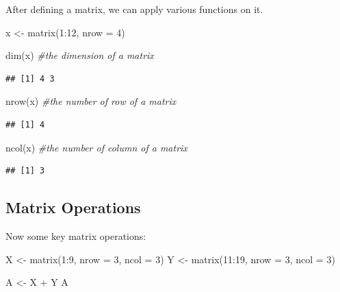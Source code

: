 \documentclass[
]{book}
\newenvironment{Shaded}{\begin{snugshade}}{\end{snugshade}}
\newcommand{\AttributeTok}[1]{\textcolor[rgb]{0.77,0.63,0.00}{#1}}
\newcommand{\CommentTok}[1]{\textcolor[rgb]{0.56,0.35,0.01}{\textit{#1}}}
\newcommand{\DecValTok}[1]{\textcolor[rgb]{0.00,0.00,0.81}{#1}}
\newcommand{\FunctionTok}[1]{\textcolor[rgb]{0.00,0.00,0.00}{#1}}
\newcommand{\NormalTok}[1]{#1}
\newcommand{\OtherTok}[1]{\textcolor[rgb]{0.56,0.35,0.01}{#1}}
\newcommand{\SpecialCharTok}[1]{\textcolor[rgb]{0.00,0.00,0.00}{#1}}
\theoremstyle{definition}
\theoremstyle{definition}
\theoremstyle{definition}
\theoremstyle{definition}
\theoremstyle{remark}
\begin{document}
After defining a matrix, we can apply various functions on it.

\begin{Shaded}
\begin{Highlighting}[]
\NormalTok{x }\OtherTok{\textless{}{-}} \FunctionTok{matrix}\NormalTok{(}\DecValTok{1}\SpecialCharTok{:}\DecValTok{12}\NormalTok{, }\AttributeTok{nrow =} \DecValTok{4}\NormalTok{)}

\FunctionTok{dim}\NormalTok{(x)            }\CommentTok{\#the dimension of a matrix         }
\end{Highlighting}
\end{Shaded}

\begin{verbatim}
## [1] 4 3
\end{verbatim}

\begin{Shaded}
\begin{Highlighting}[]
\FunctionTok{nrow}\NormalTok{(x)           }\CommentTok{\#the number of row of a matrix }
\end{Highlighting}
\end{Shaded}

\begin{verbatim}
## [1] 4
\end{verbatim}

\begin{Shaded}
\begin{Highlighting}[]
\FunctionTok{ncol}\NormalTok{(x)           }\CommentTok{\#the number of column of a matrix }
\end{Highlighting}
\end{Shaded}

\begin{verbatim}
## [1] 3
\end{verbatim}

\hypertarget{matrix-operations}{%
\subsection{Matrix Operations}\label{matrix-operations}}

Now some key matrix operations:

\begin{Shaded}
\begin{Highlighting}[]
\NormalTok{X }\OtherTok{\textless{}{-}} \FunctionTok{matrix}\NormalTok{(}\DecValTok{1}\SpecialCharTok{:}\DecValTok{9}\NormalTok{, }\AttributeTok{nrow =} \DecValTok{3}\NormalTok{, }\AttributeTok{ncol =} \DecValTok{3}\NormalTok{)}
\NormalTok{Y }\OtherTok{\textless{}{-}} \FunctionTok{matrix}\NormalTok{(}\DecValTok{11}\SpecialCharTok{:}\DecValTok{19}\NormalTok{, }\AttributeTok{nrow =} \DecValTok{3}\NormalTok{, }\AttributeTok{ncol =} \DecValTok{3}\NormalTok{)}

\NormalTok{A }\OtherTok{\textless{}{-}}\NormalTok{ X }\SpecialCharTok{+}\NormalTok{ Y}
\NormalTok{A}
\end{Highlighting}
\end{Shaded}
\end{document}

